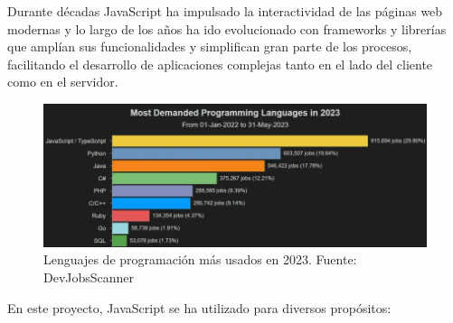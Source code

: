 \documentclass[a4paper, 12pt]{book}
\begin{document}
Durante décadas JavaScript ha impulsado la interactividad de las páginas web modernas y lo largo de los años ha ido evolucionado con frameworks y librerías que amplían sus funcionalidades y simplifican gran parte de los procesos, facilitando el desarrollo de aplicaciones complejas tanto en el lado del cliente como en el servidor.

\begin{figure}[H]
    \centering
    \includegraphics[width=\linewidth]{img/prog_languages_popularity.png}
    \caption{Lenguajes de programación más usados en 2023. Fuente: DevJobsScanner \cite{anyadike2023_programming}}
    \label{fig:prog-languages}
\end{figure}
En este proyecto, JavaScript se ha utilizado para diversos propósitos:
\end{document}
